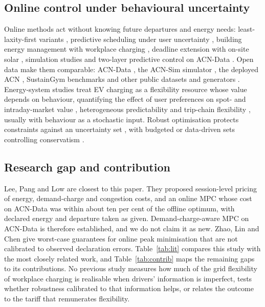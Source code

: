 \subsection{Online control under behavioural uncertainty}
Online methods act without knowing future departures and energy needs: least-laxity-first variants \cite{Nakahira2017sLLF}, predictive scheduling under user uncertainty \cite{Wang2016Predictive}, building energy management with workplace charging \cite{Wu2017Office}, deadline extension with on-site solar \cite{Ardakanian2014Deadlines,Lee2016SharedSolar}, simulation studies \cite{Ramanujam2017Impact} and two-layer predictive control on ACN-Data \cite{Ahmad2023TwoLayer}. Open data make them comparable: ACN-Data \cite{Lee2019ACNData}, the ACN-Sim simulator \cite{Lee2021ACNSim}, the deployed ACN \cite{Lee2021ACN}, SustainGym benchmarks \cite{Yeh2023SustainGym} and other public datasets and generators \cite{Flammini2019Stats,Lucas2018Indicators,GaeteMorales2021emobpy}. Energy-system studies treat EV charging as a flexibility resource whose value depends on behaviour, quantifying the effect of user preferences on spot- and intraday-market value \cite{Chemudupaty2025SpotMarkets,Chemudupaty2025Intraday}, heterogeneous predictability \cite{Kreft2024Predictability} and trip-chain flexibility \cite{Tang2025TripChain}, usually with behaviour as a stochastic input. Robust optimisation protects constraints against an uncertainty set \cite{Soyster1973}, with budgeted \cite{Bertsimas2004Price} or data-driven \cite{Bertsimas2018DataDriven,Esfahani2018Wasserstein} sets controlling conservatism \cite{Gorissen2015Guide,Mayne2014MPC}.

\subsection{Research gap and contribution}
Lee, Pang and Low \cite{Lee2020Pricing} are closest to this paper. They proposed session-level pricing of energy, demand-charge and congestion costs, and an online MPC whose cost on ACN-Data was within about ten per cent of the offline optimum, with declared energy and departure taken as given. Demand-charge-aware MPC on ACN-Data is therefore established, and we do not claim it as new. Zhao, Lin and Chen \cite{Zhao2017RobustOnline} give worst-case guarantees for online peak minimisation that are not calibrated to observed declaration errors. Table~\ref{tab:lit} compares this study with the most closely related work, and Table~\ref{tab:contrib} maps the remaining gaps to its contributions. No previous study measures how much of the grid flexibility of workplace charging is realisable when drivers' information is imperfect, tests whether robustness calibrated to that information helps, or relates the outcome to the tariff that remunerates flexibility.

